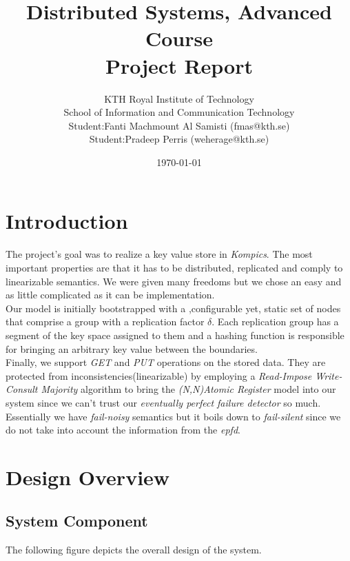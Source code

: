 \documentclass[a4paper, 11pt]{article}
\title{Distributed Systems, Advanced Course \\ 
		Project Report}
\author{KTH Royal Institute of Technology \\ 
	School of Information and Communication Technology \\
	Student:Fanti Machmount Al Samisti (fmas@kth.se) \\
	Student:Pradeep Perris (weherage@kth.se)}
\date{\today{}}
\begin{document}
\maketitle

\tableofcontents

\clearpage

\section{Introduction}

The project's goal was to realize a key value store in \textit{Kompics}. The most important properties are that it has to be distributed, replicated and comply to linearizable semantics. We were given many freedoms but we chose an easy and as little complicated as it can be implementation. \\
Our model is initially bootstrapped with a ,configurable yet, static set of nodes that comprise a group with a replication factor $\delta$. Each replication group has a segment of the key space assigned to them and a hashing function is responsible for bringing an arbitrary key value between the boundaries. \\
Finally, we support \textit{GET} and \textit{PUT} operations on the stored data. They are protected from inconsistencies(linearizable) by employing a \textit{Read-Impose Write-Consult Majority} algorithm to bring the \textit{(N,N)Atomic Register} model into our system since we can't trust our \textit{eventually perfect failure detector} so much. Essentially we have \textit{fail-noisy} semantics but it boils down to \textit{fail-silent} since we do not take into account the information from the \textit{epfd}.

\section{Design Overview}

\subsection{System Component}
The following figure depicts the overall design of the system.
\end{document}
